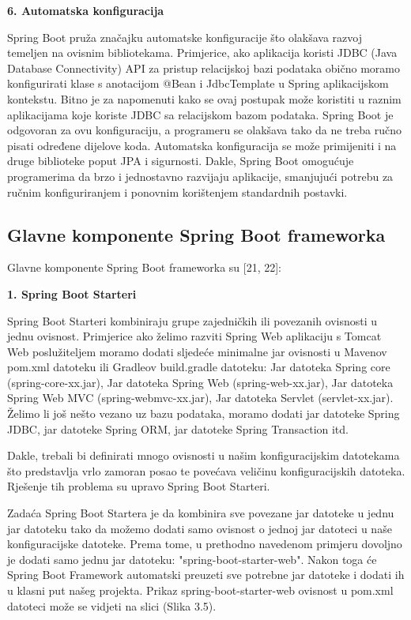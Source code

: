 \documentclass[times, utf8, zavrsni]{fer}
\begin{document}
\vspace{\baselineskip}

 \textbf{6. Automatska konfiguracija} 
 
 Spring Boot pruža značajku automatske konfiguracije što olakšava razvoj temeljen na ovisnim bibliotekama. Primjerice, ako aplikacija koristi JDBC (Java Database Connectivity) API za pristup relacijskoj bazi podataka obično moramo konfigurirati klase s anotacijom @Bean i JdbcTemplate u Spring aplikacijskom kontekstu.  Bitno je za napomenuti kako se ovaj postupak može koristiti u raznim aplikacijama koje koriste JDBC sa relacijskom bazom podataka. Spring Boot je odgovoran za ovu konfiguraciju, a programeru se olakšava tako da ne treba ručno pisati određene dijelove koda. Automatska konfiguracija se može primijeniti i na druge biblioteke poput JPA i sigurnosti. Dakle, Spring Boot omogućuje programerima da brzo i jednostavno razvijaju aplikacije, smanjujući potrebu za ručnim konfiguriranjem i ponovnim korištenjem standardnih postavki.
\newpage
 \subsection{Glavne komponente Spring Boot frameworka}
 Glavne komponente Spring Boot frameworka su [21, 22]:
 
 \textbf{1. Spring Boot Starteri} 

 Spring Boot Starteri kombiniraju grupe zajedničkih ili povezanih ovisnosti u jednu ovisnost. Primjerice ako želimo razviti Spring Web aplikaciju s Tomcat Web poslužiteljem moramo dodati sljedeće minimalne  jar ovisnosti u Mavenov pom.xml datoteku ili Gradleov build.gradle datoteku:
Jar datoteka Spring core (spring-core-xx.jar),
Jar datoteka Spring Web (spring-web-xx.jar),
Jar datoteka Spring Web MVC (spring-webmvc-xx.jar),
Jar datoteka Servlet (servlet-xx.jar). Želimo li još nešto vezano uz bazu podataka, moramo dodati jar datoteke Spring JDBC, jar datoteke Spring ORM, jar datoteke Spring Transaction itd.

Dakle, trebali bi definirati mnogo ovisnosti u našim konfiguracijskim datotekama što predstavlja vrlo zamoran posao te povećava veličinu konfiguracijskih datoteka. Rješenje tih problema su upravo Spring Boot Starteri.

Zadaća Spring Boot Startera je da kombinira sve povezane jar datoteke u jednu jar datoteku tako da možemo dodati samo ovisnost o jednoj jar datoteci u naše konfiguracijske datoteke. Prema tome, u prethodno navedenom primjeru dovoljno je dodati samo jednu jar datoteku: "spring-boot-starter-web". Nakon toga će Spring Boot Framework automatski preuzeti sve potrebne jar datoteke i dodati ih u klasni put našeg projekta. Prikaz spring-boot-starter-web ovisnost u pom.xml datoteci može se vidjeti na slici (Slika 3.5).
\end{document}
